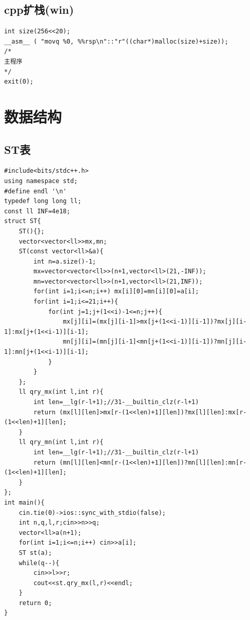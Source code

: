 \documentclass[11pt,a4paper,twocolumn]{ctexart}  %
\begin{document}
\subsection{cpp扩栈(win)}
\begin{lstlisting}[caption={扩栈指令}]
int size(256<<20);
__asm__ ( "movq %0, %%rsp\n"::"r"((char*)malloc(size)+size)); 
/*
主程序
*/
exit(0);
\end{lstlisting}

\newpage

\section{数据结构}

\subsection{ST表}
\begin{lstlisting}[caption={ST表},label={lst:ST表}]
#include<bits/stdc++.h>
using namespace std;
#define endl '\n'
typedef long long ll;
const ll INF=4e18;
struct ST{
    ST(){};
    vector<vector<ll>>mx,mn;
    ST(const vector<ll>&a){
        int n=a.size()-1;
        mx=vector<vector<ll>>(n+1,vector<ll>(21,-INF));
        mn=vector<vector<ll>>(n+1,vector<ll>(21,INF));
        for(int i=1;i<=n;i++) mx[i][0]=mn[i][0]=a[i];
        for(int i=1;i<=21;i++){
            for(int j=1;j+(1<<i)-1<=n;j++){
                mx[j][i]=(mx[j][i-1]>mx[j+(1<<i-1)][i-1])?mx[j][i-1]:mx[j+(1<<i-1)][i-1];
                mn[j][i]=(mn[j][i-1]<mn[j+(1<<i-1)][i-1])?mn[j][i-1]:mn[j+(1<<i-1)][i-1];
            }
        }
    };
    ll qry_mx(int l,int r){
        int len=__lg(r-l+1);//31-__builtin_clz(r-l+1)
        return (mx[l][len]>mx[r-(1<<len)+1][len])?mx[l][len]:mx[r-(1<<len)+1][len];
    }  
    ll qry_mn(int l,int r){
        int len=__lg(r-l+1);//31-__builtin_clz(r-l+1)
        return (mn[l][len]<mn[r-(1<<len)+1][len])?mn[l][len]:mn[r-(1<<len)+1][len];
    }  
};
int main(){
    cin.tie(0)->ios::sync_with_stdio(false);
    int n,q,l,r;cin>>n>>q;
    vector<ll>a(n+1);
    for(int i=1;i<=n;i++) cin>>a[i];
    ST st(a);
    while(q--){
        cin>>l>>r;
        cout<<st.qry_mx(l,r)<<endl;
    }
    return 0;
}
\end{lstlisting}
\end{document}
